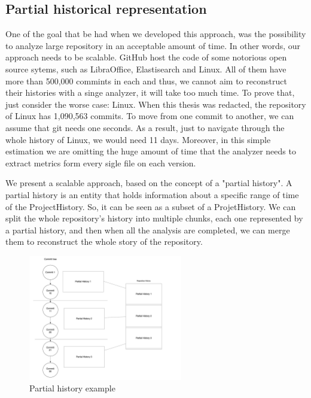 \subsection*{Partial historical representation}
One of the goal that be had when we developed this approach, was the possibility to analyze large repository in an acceptable amount of time. 
In other words, our approach needs to be scalable.
GitHub host the code of some notorious open source sytems, such as LibraOffice, Elastisearch and Linux.
All of them have more than 500,000 commints in each and thus, we cannot aim to reconstruct their histories with a singe analyzer, it will take too much time.  
To prove that, just consider the worse case: Linux. 
When this thesis was redacted, the repository of Linux has 1,090,563 commits. 
To move from one commit to another, we can assume that git needs one seconds. 
As a result, just to navigate through the whole history of Linux, we would need 11 days.
Moreover, in this simple estimation we are omitting the huge amount of time that the analyzer needs to extract metrics form every sigle file on each version. 

We present a scalable approach, based on the concept of a "partial history". 
A partial history is an entity that holds information about a specific range of time of the ProjectHistory. 
So, it can be seen as a subset of a ProjetHistory. 
We can split the whole repository's history into multiple chunks, each one represented by a partial history, 
and then when all the analysis are completed, we can merge them to reconstruct the whole story of the repository.


\begin{figure}
    \includegraphics[width=0.6\textwidth]{PartialHistory.png}
    \caption{Partial history example}
    \label{fig:PartialHistory}
\end{figure}

